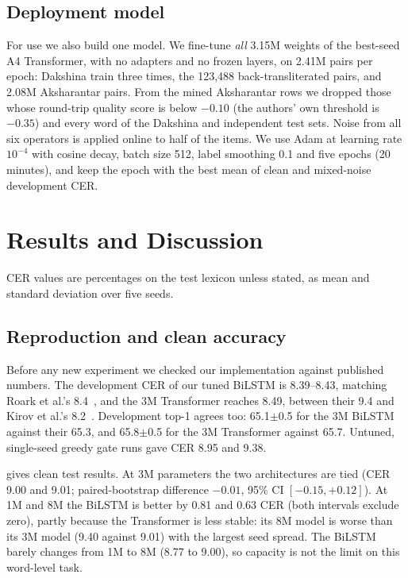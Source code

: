 \documentclass[conference]{IEEEtran}
\begin{document}
\subsection{Deployment model}
For use we also build one model.
We fine-tune \emph{all} 3.15M weights of the best-seed A4 Transformer, with no adapters and no frozen layers, on 2.41M pairs per epoch: Dakshina train three times, the 123{,}488 back-transliterated pairs, and 2.08M Aksharantar pairs.
From the mined Aksharantar rows we dropped those whose round-trip quality score is below $-0.10$ (the authors' own threshold is $-0.35$) and every word of the Dakshina and independent test sets.
Noise from all six operators is applied online to half of the items.
We use Adam at learning rate $10^{-4}$ with cosine decay, batch size 512, label smoothing 0.1 and five epochs (20 minutes), and keep the epoch with the best mean of clean and mixed-noise development CER.

\section{Results and Discussion}
\label{sec:results}
CER values are percentages on the test lexicon unless stated, as mean and standard deviation over five seeds.

\subsection{Reproduction and clean accuracy}
Before any new experiment we checked our implementation against published numbers.
The development CER of our tuned BiLSTM is 8.39--8.43, matching Roark et al.'s 8.4~\cite{roark2020dakshina}, and the 3M Transformer reaches 8.49, between their 9.4 and Kirov et al.'s 8.2~\cite{kirov2024context}.
Development top-1 agrees too: 65.1$\pm$0.5 for the 3M BiLSTM against their 65.3, and 65.8$\pm$0.5 for the 3M Transformer against 65.7.
Untuned, single-seed greedy gate runs gave CER 8.95 and 9.38.

 gives clean test results.
At 3M parameters the two architectures are tied (CER 9.00 and 9.01; paired-bootstrap difference $-0.01$, 95\% CI $[-0.15,+0.12]$).
At 1M and 8M the BiLSTM is better by 0.81 and 0.63 CER (both intervals exclude zero), partly because the Transformer is less stable: its 8M model is worse than its 3M model (9.40 against 9.01) with the largest seed spread.
The BiLSTM barely changes from 1M to 8M (8.77 to 9.00), so capacity is not the limit on this word-level task.
\end{document}
